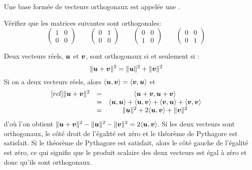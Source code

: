 Une base formée de vecteurs orthogonaux est appelée une .

\begin{exerciceB}\label{ex:orthogonal}
Vérifiez que les matrices suivantes sont orthogonales:
\[
\begin{pmatrix}
1 & 0 \\ 0 & 0
\end{pmatrix}\qquad
\begin{pmatrix}
0 & 1 \\ 0 & 0
\end{pmatrix}\qquad
\begin{pmatrix}
0 & 0 \\ 1 & 0
\end{pmatrix}\qquad
\begin{pmatrix}
0 & 0 \\ 0 & 1
\end{pmatrix}
\]
\end{exerciceB}

\begin{theo}
 Deux vecteurs réels, $\boldsymbol{u}$ et $\boldsymbol{v}$, sont orthogonaux si et seulement si :
\[
\lVert\boldsymbol{u}+\boldsymbol{v}\rVert^2 = \lVert\boldsymbol{u}\rVert^2 + \lVert\boldsymbol{v}\rVert^2
\] 
\vspace{-20pt}
\proof
Si on a deux vecteurs réels, alors $\langle \boldsymbol{u}, \boldsymbol{v}\rangle = \langle \boldsymbol{v}, \boldsymbol{u}\rangle$ et
\[
\begin{matrix}[rcl]
\lVert\boldsymbol{u} + \boldsymbol{v}\rVert^2 &=& \langle \boldsymbol{u} +\boldsymbol{v},\boldsymbol{u} + \boldsymbol{v} \rangle \\
&=& \langle \boldsymbol{u}, \boldsymbol{u} \rangle + \langle \boldsymbol{u}, \boldsymbol{v} \rangle + \langle \boldsymbol{v}, \boldsymbol{u} \rangle + \langle \boldsymbol{v}, \boldsymbol{v} \rangle\\
&=& \lVert\boldsymbol{u}\rVert^2 + 2\langle \boldsymbol{u}, \boldsymbol{v} \rangle  + \lVert\boldsymbol{v}\rVert^2 
\end{matrix}
\]
d'où l'on obtient $\lVert\boldsymbol{u}+\boldsymbol{v}\rVert^2 - \lVert\boldsymbol{u}\rVert^2 - \lVert\boldsymbol{v}\rVert^2 = 2\langle \boldsymbol{u}, \boldsymbol{v} \rangle$. Si les deux vecteurs sont
orthogonaux, le côté droit de l'égalité est zéro et le théorème de Pythagore est satisfait.  Si le théorème de Pythagore est
satisfait, alors le côté gauche de l'égalité est zéro, ce qui signifie que le produit scalaire des deux vecteurs est égal à zéro et donc
qu'ils sont orthogonaux.
\end{theo}

